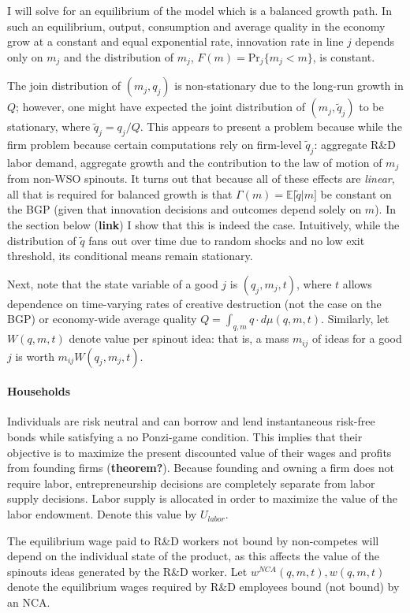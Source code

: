 \documentclass[12pt,english]{article}
\theoremstyle{remark}
\begin{document}
I will solve for an equilibrium of the model which is a balanced growth path. In such an equilibrium, output, consumption and average quality in the economy grow at a constant and equal exponential rate, innovation rate in line $j$ depends only on $m_j$ and the distribution of $m_j$, $F(m) = \mathrm{Pr}_j\{m_j < m\}$, is constant. 

The join distribution of $(m_j,q_j)$ is non-stationary due to the long-run growth in $Q$; however, one might have expected the joint distribution of $(m_j,\tilde{q}_j)$ to be stationary, where $\tilde{q}_j = q_j/Q$. This appears to present a problem because while the firm problem because certain computations rely on firm-level $\tilde{q}_j$: aggregate R\&D labor demand, aggregate growth and the contribution to the law of motion of $m_j$ from non-WSO spinouts. It turns out that because all of these effects are \textit{linear}, all that is required for balanced growth is that $\Gamma(m) = \mathbb{E}\Big[ \tilde{q} \Big| m \Big]$ be constant on the BGP (given that innovation decisions and outcomes depend solely on $m$). In the section below (\textbf{link}) I show that this is indeed the case. Intuitively, while the distribution of $\tilde{q}$ fans out over time due to random shocks and no low exit threshold, its conditional means remain stationary. 

Next, note that the state variable of a good $j$ is $(q_j,m_j,t)$, where $t$ allows dependence on time-varying rates of creative destruction (not the case on the BGP) or economy-wide average quality $Q = \int_{q,m} q  \cdot d\mu(q,m,t)$. Similarly, let $W(q,m,t)$ denote value per spinout idea: that is, a mass $m_{ij}$ of ideas for a good $j$ is worth $m_{ij} W(q_j,m_j,t)$.

\paragraph{Households}

Individuals are risk neutral and can borrow and lend instantaneous risk-free bonds while satisfying a no Ponzi-game condition. This implies that their objective is to maximize the present discounted value of their wages and profits from founding firms (\textbf{theorem?}). Because founding and owning a firm does not require labor, entrepreneurship decisions are completely separate from labor supply decisions. Labor supply is allocated in order to maximize the value of the labor endowment. Denote this value by $U_{labor}$. 

The equilibrium wage paid to R\&D workers not bound by non-competes will depend on the individual state of the product, as this affects the value of the spinouts ideas generated by the R\&D worker. Let $w^{NCA}(q,m,t),w(q,m,t)$ denote the equilibrium wages required by R\&D employees bound (not bound) by an NCA.
\end{document}
